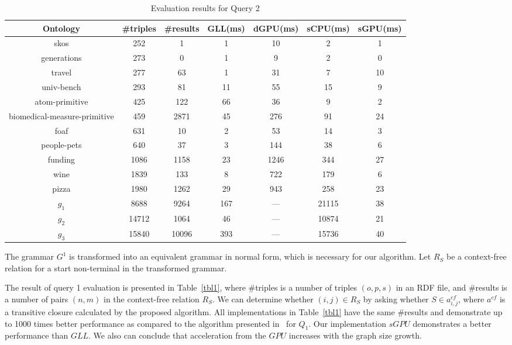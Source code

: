 \begin{table*}[h]
\centering
\caption{Evaluation results for Query 2}
\label{tbl2}

\begin{tabular}{ | c | c | c | c | c | c | c |}
\hline
Ontology & \#triples & \#results & GLL(ms) & dGPU(ms) & sCPU(ms) & sGPU(ms) \\
\hline 
\hline
skos        & 252 & 1 & 1 & 10 & 2 & 1\\
generations & 273 & 0 & 1 & 9 & 2 & 0\\
travel      & 277 & 63 & 1 & 31 & 7 & 10\\
univ-bench  & 293 & 81 & 11 & 55 & 15 & 9\\
atom-primitive & 425 & 122 & 66 & 36 & 9 & 2\\
biomedical-measure-primitive & 459 & 2871 & 45 & 276 & 91 & 24\\
foaf        & 631 & 10 & 2 & 53 & 14 & 3\\
people-pets & 640 & 37 & 3 & 144 & 38 & 6\\
funding     & 1086 & 1158 & 23 & 1246 & 344 & 27\\
wine        & 1839 & 133 & 8 & 722 & 179 & 6\\
pizza       & 1980 & 1262 & 29 & 943 & 258 & 23\\
$g_{1}$     & 8688 & 9264 & 167 & --- & 21115 & 38\\
$g_{2}$     & 14712 & 1064 & 46 & --- & 10874 & 21\\
$g_{3}$     & 15840 & 10096 & 393 & --- & 15736 & 40\\
\hline
\end{tabular}

\end{table*}


The grammar $G^1$ is transformed into an equivalent grammar in normal form, which is necessary for our algorithm. Let $R_S$ be a context-free relation for a start non-terminal in the transformed grammar.

The result of query 1 evaluation is presented in Table~\ref{tbl1}, where \#triples is a number of triples $(o,p,s)$ in an RDF file, and \#results is a number of pairs $(n,m)$ in the context-free relation $R_S$. We can determine whether $(i,j) \in R_S$ by asking whether $S \in a^{cf}_{i,j}$, where $a^{cf}$ is a transitive closure calculated by the proposed algorithm. All implementations in Table~\ref{tbl1} have the same \#results and demonstrate up to 1000 times better performance as compared to the algorithm presented in~\cite{RDF} for $Q_1$. Our implementation $sGPU$ demonstrates a better performance than $GLL$. We also can conclude that acceleration from the $GPU$ increases with the graph size growth.

